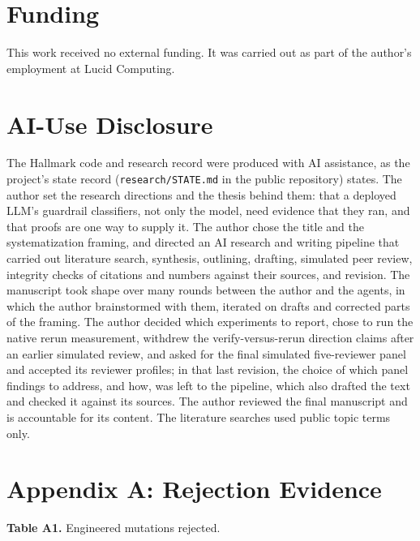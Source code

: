 \documentclass[11pt]{article}
\begin{document}
\section*{Funding}

This work received no external funding. It was carried out as part of the author's employment at Lucid Computing.

\section*{AI-Use Disclosure}

The Hallmark code and research record were produced with AI assistance, as the project's state record (\texttt{research/\allowbreak{}STATE.\allowbreak{}md} in the public repository) states. The author set the research directions and the thesis behind them: that a deployed LLM's guardrail classifiers, not only the model, need evidence that they ran, and that proofs are one way to supply it. The author chose the title and the systematization framing, and directed an AI research and writing pipeline that carried out literature search, synthesis, outlining, drafting, simulated peer review, integrity checks of citations and numbers against their sources, and revision. The manuscript took shape over many rounds between the author and the agents, in which the author brainstormed with them, iterated on drafts and corrected parts of the framing. The author decided which experiments to report, chose to run the native rerun measurement, withdrew the verify-versus-rerun direction claims after an earlier simulated review, and asked for the final simulated five-reviewer panel and accepted its reviewer profiles; in that last revision, the choice of which panel findings to address, and how, was left to the pipeline, which also drafted the text and checked it against its sources. The author reviewed the final manuscript and is accountable for its content. The literature searches used public topic terms only.

\section*{Appendix A: Rejection Evidence}

\textbf{Table A1.} Engineered mutations rejected.
\end{document}

